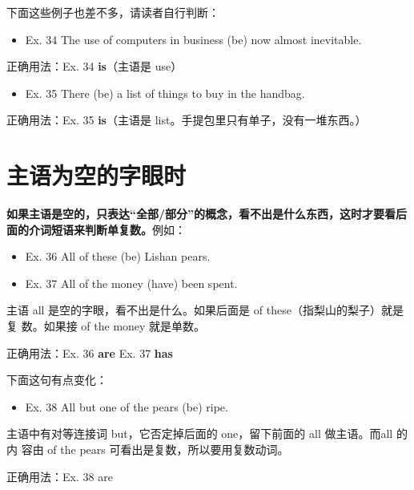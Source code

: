 下面这些例子也差不多，请读者自行判断：
\begin{mybox}
\begin{itemize}
\item   Ex. 34 The use of computers in business (be) now almost inevitable.
\end{itemize}

\tcblower

正确用法：Ex. 34 \textbf{is}（主语是 use）
\end{mybox}


\begin{mybox}
\begin{itemize}
\item   Ex. 35 There (be) a list of things to buy in the handbag.
\end{itemize}

\tcblower

正确用法：Ex. 35 \textbf{is}（主语是 list。手提包里只有单子，没有一堆东西。）
\end{mybox}

\section{主语为空的字眼时}

\textbf{如果主语是空的，只表达“全部/部分”的概念，看不出是什么东西，这时才要看后面的介词短语来判断单复数。}例如：
\begin{mybox}

\begin{itemize}
\item   Ex. 36 All of these (be) Lishan pears.
\item   Ex. 37 All of the money (have) been spent.
\end{itemize}

主语 all 是空的字眼，看不出是什么。如果后面是 of these（指梨山的梨子）就是复
数。如果接 of the money 就是单数。

\tcblower

正确用法：Ex. 36 \textbf{are} \qquad\quad Ex. 37 \textbf{has}
\end{mybox}

下面这句有点变化：
\begin{mybox}

\begin{itemize}
\item   Ex. 38 All but one of the pears (be) ripe.
\end{itemize}

主语中有对等连接词 but，它否定掉后面的 one，留下前面的 all 做主语。而all 的内
容由 of the pears 可看出是复数，所以要用复数动词。

\tcblower

正确用法：Ex. 38 are
\end{mybox}

